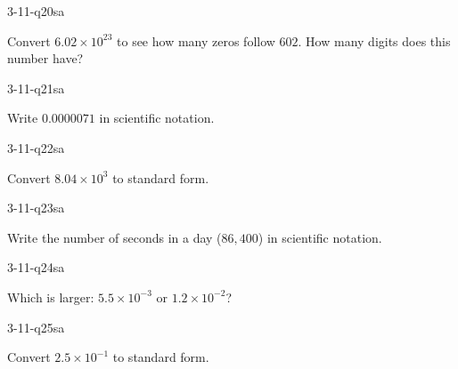 \begin{practiceQuestion}{3-11-q20}{sa}
\begin{questionText}
Convert $6.02 \times 10^{23}$ to see how many zeros follow $602$. How many digits does this number have?
\end{questionText}
\end{practiceQuestion}

\begin{practiceQuestion}{3-11-q21}{sa}
\begin{questionText}
Write $0.0000071$ in scientific notation.
\end{questionText}
\end{practiceQuestion}

\begin{practiceQuestion}{3-11-q22}{sa}
\begin{questionText}
Convert $8.04 \times 10^3$ to standard form.
\end{questionText}
\end{practiceQuestion}

\begin{practiceQuestion}{3-11-q23}{sa}
\begin{questionText}
Write the number of seconds in a day ($86{,}400$) in scientific notation.
\end{questionText}
\end{practiceQuestion}

\begin{practiceQuestion}{3-11-q24}{sa}
\begin{questionText}
Which is larger: $5.5 \times 10^{-3}$ or $1.2 \times 10^{-2}$?
\end{questionText}
\end{practiceQuestion}

\begin{practiceQuestion}{3-11-q25}{sa}
\begin{questionText}
Convert $2.5 \times 10^{-1}$ to standard form.
\end{questionText}
\end{practiceQuestion}

